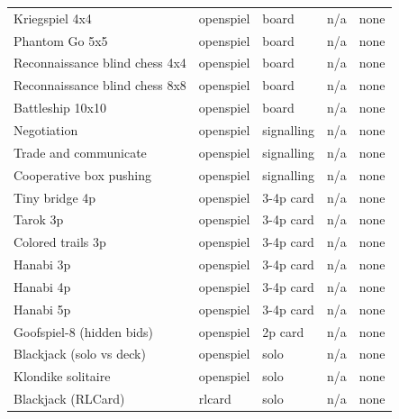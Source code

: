 \begin{longtable}{l l l r l}
Kriegspiel 4x4 & openspiel & board & n/a & none \\
Phantom Go 5x5 & openspiel & board & n/a & none \\
Reconnaissance blind chess 4x4 & openspiel & board & n/a & none \\
Reconnaissance blind chess 8x8 & openspiel & board & n/a & none \\
Battleship 10x10 & openspiel & board & n/a & none \\
Negotiation & openspiel & signalling & n/a & none \\
Trade and communicate & openspiel & signalling & n/a & none \\
Cooperative box pushing & openspiel & signalling & n/a & none \\
Tiny bridge 4p & openspiel & 3-4p card & n/a & none \\
Tarok 3p & openspiel & 3-4p card & n/a & none \\
Colored trails 3p & openspiel & 3-4p card & n/a & none \\
Hanabi 3p & openspiel & 3-4p card & n/a & none \\
Hanabi 4p & openspiel & 3-4p card & n/a & none \\
Hanabi 5p & openspiel & 3-4p card & n/a & none \\
Goofspiel-8 (hidden bids) & openspiel & 2p card & n/a & none \\
Blackjack (solo vs deck) & openspiel & solo & n/a & none \\
Klondike solitaire & openspiel & solo & n/a & none \\
Blackjack (RLCard) & rlcard & solo & n/a & none \\
\end{longtable}

